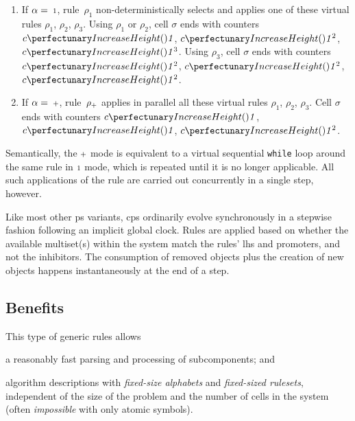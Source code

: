 \begin{enumerate}
\item If \(\alpha = \: {\scriptstyle 1}\), rule~\(\rho_1\) 
non-deterministically selects and applies one of these virtual rules \(\rho_1\), \(\rho_2\), \(\rho_3\).
Using \(\rho_1\) or \(\rho_2\), 
cell \(\sigma\) ends with counters \(\cpfunc{c}{\cpundig}\), \(\cpfunc{c}{\cpundig^2}\), \(\cpfunc{c}{\cpundig^3}\).
Using \(\rho_3\),
cell \(\sigma\) ends with counters \(\cpfunc{c}{\cpundig^2}\), \(\cpfunc{c}{\cpundig^2}\), \(\cpfunc{c}{\cpundig^2}\).

\smallskip
\item If \(\alpha = \: {\scriptstyle +}\), rule~\(\rho_{\scriptstyle +}\) 
applies in parallel all these virtual rules \(\rho_1\), \(\rho_2\), \(\rho_3\).
Cell \(\sigma\) ends with counters \(\cpfunc{c}{\cpundig}\), \(\cpfunc{c}{\cpundig}\), \(\cpfunc{c}{\cpundig^2}\).
\end{enumerate}

Semantically, the \({\scriptstyle +}\) mode is equivalent to a virtual sequential \texttt{while} loop around the same rule in \({\scriptstyle 1}\) mode, which is repeated until it is no longer applicable.  All such applications of the rule are carried out concurrently in a single step, however.

Like most other \gls{ps} variants, \gls{cps} ordinarily evolve synchronously in a stepwise fashion following an implicit global clock.  Rules are applied based on whether the available multiset(s) within the system match the rules' \gls{lhs} and \glspl{promoter}, and not the \glspl{inhibitor}.  The consumption of removed objects plus the creation of new objects happens instantaneously at the end of a step.

\subsection{Benefits}
This type of generic rules allows
\begin{inparaenum}[(i)]
\item a reasonably fast parsing and processing of subcomponents; and
\item algorithm descriptions with \emph{fixed-size alphabets} and \emph{fixed-sized \glspl{ruleset}}, 
independent of the size of the problem and the number of cells in the system (often \emph{impossible} with only atomic symbols).
\end{inparaenum}

